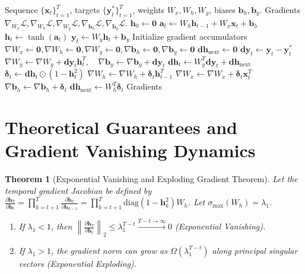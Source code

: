 \documentclass[11pt,a4paper]{article}
\newtheorem{theorem}{Theorem}
\theoremstyle{definition}
\begin{document}
\begin{algorithm}[H]
\caption{Backpropagation Through Time (BPTT) for Vanilla RNN}
\label{alg:bptt}
\begin{algorithmic}[1]
\Require Sequence $\{\mathbf{x}_t\}_{t=1}^T$, targets $\{\mathbf{y}_t^*\}_{t=1}^T$, weights $W_x, W_h, W_y$, biases $\mathbf{b}_h, \mathbf{b}_y$.
\Ensure Gradients $\nabla_{W_x} \mathcal{L}, \nabla_{W_h} \mathcal{L}, \nabla_{W_y} \mathcal{L}, \nabla_{\mathbf{b}_h} \mathcal{L}, \nabla_{\mathbf{b}_y} \mathcal{L}$.
\State $\mathbf{h}_0 \gets \mathbf{0}$
 
    \State $\mathbf{a}_t \gets W_h \mathbf{h}_{t-1} + W_x \mathbf{x}_t + \mathbf{b}_h$
    \State $\mathbf{h}_t \gets \tanh(\mathbf{a}_t)$
    \State $\mathbf{y}_t \gets W_y \mathbf{h}_t + \mathbf{b}_y$
\EndFor
\State Initialize gradient accumulators $\nabla W_x \gets \mathbf{0}, \nabla W_h \gets \mathbf{0}, \nabla W_y \gets \mathbf{0}, \nabla \mathbf{b}_h \gets \mathbf{0}, \nabla \mathbf{b}_y \gets \mathbf{0}$
\State $\mathbf{d}\mathbf{h}_{\text{next}} \gets \mathbf{0}$
 
    \State $\mathbf{d}\mathbf{y}_t \gets \mathbf{y}_t - \mathbf{y}_t^*$
    \State $\nabla W_y \gets \nabla W_y + \mathbf{d}\mathbf{y}_t \mathbf{h}_t^T, \quad \nabla \mathbf{b}_y \gets \nabla \mathbf{b}_y + \mathbf{d}\mathbf{y}_t$
    \State $\mathbf{d}\mathbf{h}_t \gets W_y^T \mathbf{d}\mathbf{y}_t + \mathbf{d}\mathbf{h}_{\text{next}}$
    \State $\boldsymbol{\delta}_t \gets \mathbf{d}\mathbf{h}_t \odot (1 - \mathbf{h}_t^2)$
    \State $\nabla W_h \gets \nabla W_h + \boldsymbol{\delta}_t \mathbf{h}_{t-1}^T$
    \State $\nabla W_x \gets \nabla W_x + \boldsymbol{\delta}_t \mathbf{x}_t^T$
    \State $\nabla \mathbf{b}_h \gets \nabla \mathbf{b}_h + \boldsymbol{\delta}_t$
    \State $\mathbf{d}\mathbf{h}_{\text{next}} \gets W_h^T \boldsymbol{\delta}_t$
\EndFor
\State \Return Gradients
\end{algorithmic}
\end{algorithm}

\section{Theoretical Guarantees and Gradient Vanishing Dynamics}

\begin{theorem}[Exponential Vanishing and Exploding Gradient Theorem]
\label{thm:vanishing_gradient}
Let the temporal gradient Jacobian be defined by $\frac{\partial \mathbf{h}_T}{\partial \mathbf{h}_t} = \prod_{k=t+1}^T \frac{\partial \mathbf{h}_k}{\partial \mathbf{h}_{k-1}} = \prod_{k=t+1}^T \text{diag}(1 - \mathbf{h}_k^2) W_h$.
Let $\sigma_{\max}(W_h) = \lambda_1$.
\begin{enumerate}
    \item If $\lambda_1 < 1$, then $\left\| \frac{\partial \mathbf{h}_T}{\partial \mathbf{h}_t} \right\|_2 \le \lambda_1^{T-t} \xrightarrow{T-t \to \infty} 0$ (Exponential Vanishing).
    \item If $\lambda_1 > 1$, the gradient norm can grow as $\Omega(\lambda_1^{T-t})$ along principal singular vectors (Exponential Exploding).
\end{enumerate}
\end{theorem}
\end{document}

